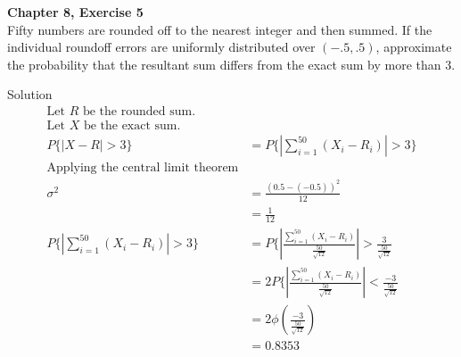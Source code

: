 \documentclass{article}
\begin{document}
\begin{spacing}{1.1}
\newpage
\begin{homeworkProblem}
  {\bf Chapter 8, Exercise 5}\\
  Fifty numbers are rounded off to the nearest integer and then summed. 
  If the individual roundoff errors are uniformly distributed over 
  $(−.5, .5)$, approximate the probability that the resultant sum differs 
  from the exact sum by more than 3.
  \begin{homeworkSection}{Solution}
    \begin{align*}
      \text{Let $R$ be the rounded sum.}\\
      \text{Let $X$ be the exact sum.}\\
      P\{ |X - R| > 3 \} &= P\{ \left|\sum\limits_{i = 1}^{50} (X_i - R_i)\right| > 3\}\\
      \text{Applying the central limit theorem}\\
      \sigma^2 &= \frac{ (0.5 - (- 0.5))^2}{ 12} \\
      &= \frac{ 1}{ 12}\\
      P\{ \left|\sum\limits_{i = 1}^{50} (X_i - R_i)\right| > 3\}
      &= P\{ \left|\frac{ \sum\limits_{i = 1}^{50} (X_i - R_i)}{ \frac{ 50}{ \sqrt{12}}}\right| > \frac{ 3}{ \frac{ 50}{ \sqrt{12}}}\\
      &= 2P\{ \left|\frac{ \sum\limits_{i = 1}^{50} (X_i - R_i)}{ \frac{ 50}{ \sqrt{12}}}\right| < \frac{ -3}{ \frac{ 50}{ \sqrt{12}}}\\
      &= 2 \phi\left( \frac{ -3}{ \frac{ 50}{ \sqrt{12}}}\right)\\
      &= 0.8353\\
    \end{align*}
  \end{homeworkSection}
\end{homeworkProblem}


\end{spacing}
\end{document}

